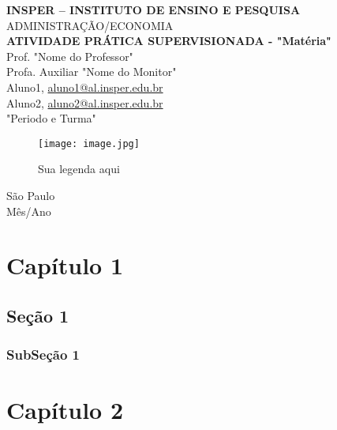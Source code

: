 \documentclass[11pt]{article}
\begin{document}
\begin{titlepage}
    \centering
    \vspace*{1cm}
    \Large\textbf{INSPER – INSTITUTO DE ENSINO E PESQUISA}\\
    \Large ADMINISTRAÇÃO/ECONOMIA\\
    \vspace{1.5cm}
    \Large\textbf{ATIVIDADE PRÁTICA SUPERVISIONADA  - "Matéria"}\\
    \vspace{1.5cm}
    Prof. "Nome do Professor"\\
    Profa. Auxiliar "Nome do Monitor"\\
    \vfill
    \normalsize
    Aluno1, \href{mailto:aluno1@al.insper.edu.br}{aluno1@al.insper.edu.br}\\
    Aluno2, \href{mailto:aluno21@al.insper.edu.br}{aluno2@al.insper.edu.br}\\
    "Periodo e Turma"\\
    \begin{figure}[h]
    \centering
    \texttt{[image: image.jpg]}
    \caption{Sua legenda aqui} 
    \label{fig:my_label}
    \end{figure}
    \vfill
    São Paulo\\
    Mês/Ano
\end{titlepage}

\newpage
\tableofcontents
\thispagestyle{empty} %
\newpage
\setcounter{page}{1} %
\justify
\onehalfspacing

\pagestyle{fancy}
\fancyhf{}
\rhead{\thepage}

\section{\textbf{Capítulo 1}}
\subsection{\textbf{Seção 1}}
\subsubsection{\textbf{SubSeção 1}}
\newpage

\section{\textbf{Capítulo 2}}
\end{document}
